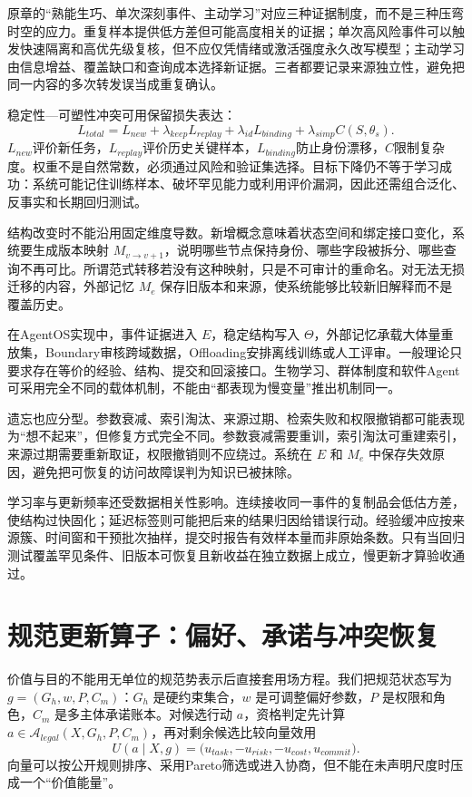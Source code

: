 原章的“熟能生巧、单次深刻事件、主动学习”对应三种证据制度，而不是三种压弯时空的应力。重复样本提供低方差但可能高度相关的证据；单次高风险事件可以触发快速隔离和高优先级复核，但不应仅凭情绪或激活强度永久改写模型；主动学习由信息增益、覆盖缺口和查询成本选择新证据。三者都要记录来源独立性，避免把同一内容的多次转发误当成重复确认。

稳定性—可塑性冲突可用保留损失表达：
\begin{equation}
L_{total}=L_{new}+\lambda_{keep}L_{replay}+\lambda_{id}L_{binding}+\lambda_{simp}C(S,\theta_s).
\end{equation}
$L_{new}$评价新任务，$L_{replay}$评价历史关键样本，$L_{binding}$防止身份漂移，$C$限制复杂度。权重不是自然常数，必须通过风险和验证集选择。目标下降仍不等于学习成功：系统可能记住训练样本、破坏罕见能力或利用评价漏洞，因此还需组合泛化、反事实和长期回归测试。

结构改变时不能沿用固定维度导数。新增概念意味着状态空间和绑定接口变化，系统要生成版本映射 $M_{v\to v+1}$，说明哪些节点保持身份、哪些字段被拆分、哪些查询不再可比。所谓范式转移若没有这种映射，只是不可审计的重命名。对无法无损迁移的内容，外部记忆 $M_e$ 保存旧版本和来源，使系统能够比较新旧解释而不是覆盖历史。

在AgentOS实现中，事件证据进入 $E$，稳定结构写入 $\Theta$，外部记忆承载大体量重放集，Boundary审核跨域数据，Offloading安排离线训练或人工评审。一般理论只要求存在等价的经验、结构、提交和回滚接口。生物学习、群体制度和软件Agent可采用完全不同的载体机制，不能由“都表现为慢变量”推出机制同一。

遗忘也应分型。参数衰减、索引淘汰、来源过期、检索失败和权限撤销都可能表现为“想不起来”，但修复方式完全不同。参数衰减需要重训，索引淘汰可重建索引，来源过期需要重新取证，权限撤销则不应绕过。系统在 $E$ 和 $M_e$ 中保存失效原因，避免把可恢复的访问故障误判为知识已被抹除。

学习率与更新频率还受数据相关性影响。连续接收同一事件的复制品会低估方差，使结构过快固化；延迟标签则可能把后来的结果归因给错误行动。经验缓冲应按来源簇、时间窗和干预批次抽样，提交时报告有效样本量而非原始条数。只有当回归测试覆盖罕见条件、旧版本可恢复且新收益在独立数据上成立，慢更新才算验收通过。

\section{规范更新算子：偏好、承诺与冲突恢复}
\label{sec:section_2317}

价值与目的不能用无单位的规范势表示后直接套用场方程。我们把规范状态写为 $g=(G_h,w,P,C_m)$：$G_h$ 是硬约束集合，$w$ 是可调整偏好参数，$P$ 是权限和角色，$C_m$ 是多主体承诺账本。对候选行动 $a$，资格判定先计算 $a\in\mathcal A_{legal}(X,G_h,P,C_m)$，再对剩余候选比较向量效用
\begin{equation}
U(a\mid X,g)=\bigl(u_{task},-u_{risk},-u_{cost},u_{commit}\bigr).
\end{equation}
向量可以按公开规则排序、采用Pareto筛选或进入协商，但不能在未声明尺度时压成一个“价值能量”。

